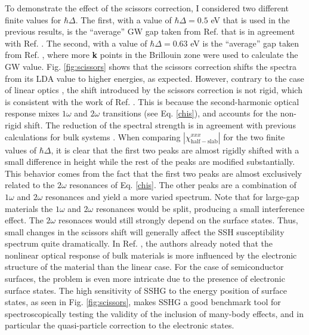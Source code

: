 To demonstrate the effect of the scissors correction, I considered two different
finite values for $\hbar\Delta$. The first, with a value of $\hbar\Delta=0.5$ eV
that is used in the previous results, is the ``average'' GW gap taken from Ref.
\cite{rohlfingPRB95} that is in agreement with Ref. \cite{garciaCPC01}. The
second, with a value of $\hbar\Delta=0.63$ eV is the ``average'' gap taken from
Ref. \cite{asahiPRB00}, where more \textbf{k} points in the Brillouin zone were
used to calculate the GW value. Fig. \ref{fig:scissors} shows that the scissors
correction shifts the spectra from its LDA value to higher energies, as
expected. However, contrary to the case of linear optics \cite{cabellosPRB09},
the shift introduced by the scissors correction is not rigid, which is
consistent with the work of Ref. \cite{nastosPRB05}. This is because the
second-harmonic optical response mixes $1\omega$ and $2\omega$ transitions (see
Eq. \eqref{chis}), and accounts for the non-rigid shift. The reduction of the
spectral strength is in agreement with previous calculations for bulk systems
\cite{nastosPRB05, luppiPRB10, leitsmannPRB05}. When comparing
$|\chi^{xxx}_{\mathrm{half-slab}}|$ for the two finite values of $\hbar\Delta$,
it is clear that the first two peaks are almost rigidly shifted with a small
difference in height while the rest of the peaks are modified substantially.
This behavior comes from the fact that the first two peaks are almost
exclusively related to the $2\omega$ resonances of Eq. \eqref{chis}. The other
peaks are a combination of $1\omega$ and $2\omega$ resonances and yield a more
varied spectrum. Note that for large-gap materials the $1\omega$ and $2\omega$
resonances would be split, producing a small interference effect. The $2\omega$
resonaces would still strongly depend on the surface states. Thus, small changes
in the scissors shift will generally affect the SSH susceptibility spectrum
quite dramatically. In Ref. \cite{adolphPRB00}, the authors already noted that
the nonlinear optical response of bulk materials is more influenced by the
electronic structure of the material than the linear case. For the case of
semiconductor surfaces, the problem is even more intricate due to the presence
of electronic surface states. The high sensitivity of SSHG to the energy
position of surface states, as seen in Fig. \ref{fig:scissors}, makes SSHG a
good benchmark tool for spectroscopically testing the validity of the inclusion
of many-body effects, and in particular the quasi-particle correction to the
electronic states.

